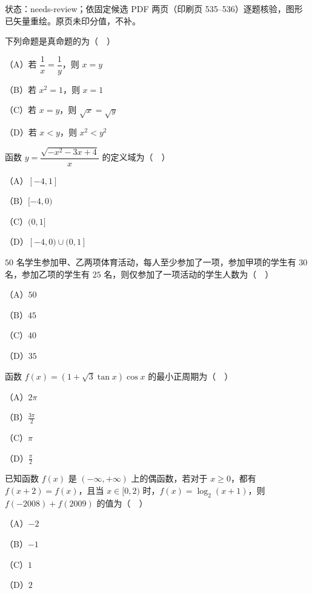 

状态：needs-review；依固定候选 PDF 两页（印刷页 535–536）逐题核验，图形已矢量重绘。原页未印分值，不补。


\begin{question}
下列命题是真命题的为（　）

（A）若 $\dfrac1x=\dfrac1y$，则 $x=y$

（B）若 $x^2=1$，则 $x=1$

（C）若 $x=y$，则 $\sqrt x=\sqrt y$

（D）若 $x<y$，则 $x^2<y^2$

\end{question}
\begin{question}
函数 $y=\dfrac{\sqrt{-x^2-3x+4}}{x}$ 的定义域为（　）

（A）$[-4,1]$

（B）$[-4,0)$

（C）$(0,1]$

（D）$[-4,0)\cup(0,1]$

\end{question}
\begin{question}
$50$ 名学生参加甲、乙两项体育活动，每人至少参加了一项，参加甲项的学生有 $30$ 名，参加乙项的学生有 $25$ 名，则仅参加了一项活动的学生人数为（　）

（A）$50$

（B）$45$

（C）$40$

（D）$35$

\end{question}
\begin{question}
函数 $f(x)=(1+\sqrt3\tan x)\cos x$ 的最小正周期为（　）

（A）$2\pi$

（B）$\frac{3\pi}{2}$

（C）$\pi$

（D）$\frac{\pi}{2}$

\end{question}
\begin{question}
已知函数 $f(x)$ 是 $(-\infty,+\infty)$ 上的偶函数，若对于 $x\geqslant0$，都有 $f(x+2)=f(x)$，且当 $x\in[0,2)$ 时，$f(x)=\log_2(x+1)$，则 $f(-2008)+f(2009)$ 的值为（　）

（A）$-2$

（B）$-1$

（C）$1$

（D）$2$

\end{question}
